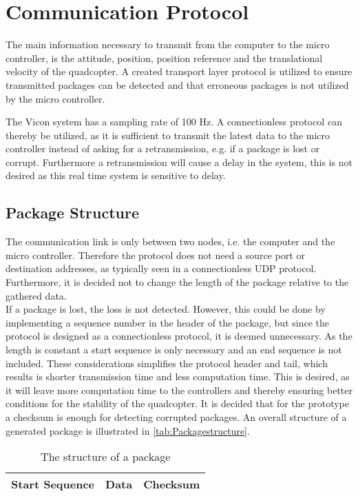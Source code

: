 \section{Communication Protocol}
The main information necessary to transmit from the computer to the micro controller, is the attitude, position, position reference and the translational velocity of the quadcopter. A created transport layer protocol is utilized to ensure transmitted packages can be detected and that erroneous packages is not utilized by the micro controller.

The Vicon system has a sampling rate of 100 Hz. A connectionless protocol can thereby be utilized, as it is sufficient to transmit the latest data to the micro controller instead of asking for a retransmission, e.g. if a package is lost or corrupt. Furthermore a retransmission will cause a delay in the system, this is not desired as this real time system is sensitive to delay.

\subsection{Package Structure}
The communication link is only between two nodes, i.e. the computer and the micro controller. Therefore the protocol does not need a source port or destination addresses, as typically seen in a connectionless UDP protocol. Furthermore, it is decided not to change the length of the package relative to the gathered data.\\
If a package is lost, the loss is not detected. However, this could be done by implementing a sequence number in the header of the package, but since the protocol is designed as a connectionless protocol, it is deemed unnecessary. As the length is constant a start sequence is only necessary and an end sequence is not included. These considerations simplifies the protocol header and tail, which results is shorter transmission time and less computation time. This is desired, as it will leave more computation time to the controllers and thereby ensuring better conditions for the stability of the quadcopter. It is decided that for the prototype a checksum is enough for detecting corrupted packages. An overall structure of a generated package is illustrated in \autoref{tab:Packagestructure}.

\begin{table}[H]\centering
\begin{tabular}{|>{\centering\arraybackslash}m{3cm}|>{\centering\arraybackslash}m{2cm}|>{\centering\arraybackslash}m{2cm}|}
\hline
Start Sequence & Data & Checksum \\
\hline
\end{tabular}
\caption{The structure of a package}
\label{tab:Packagestructure}
\end{table}

